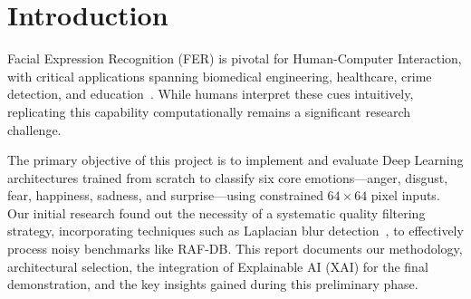 \section{Introduction}
\label{sec:introduction}

Facial Expression Recognition (FER) is pivotal for Human-Computer Interaction, with critical applications spanning biomedical engineering, healthcare, crime detection, and education~\cite{info15030135}. While humans interpret these cues intuitively, replicating this capability computationally remains a significant research challenge.

The primary objective of this project is to implement and 
evaluate Deep Learning architectures trained from scratch to classify six 
core emotions---anger, disgust, fear, happiness, sadness, and surprise---using constrained $64 \times 64$ 
pixel inputs. Our initial research found out the necessity of a systematic quality filtering strategy, 
incorporating techniques such as Laplacian blur detection~\cite{malode2025laplacian}, 
to effectively process noisy benchmarks like RAF-DB. This report documents our methodology, architectural selection, 
the integration of Explainable AI (XAI) for the final demonstration, and the key insights gained during 
this preliminary phase.

